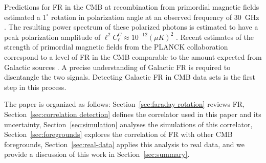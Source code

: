 \documentclass[usenatbib,hidelinks]{mnras}
\begin{document}
{  Predictions for FR in the CMB at recombination from primordial magnetic fields estimated a $1^{\circ}$ rotation in polarization angle at an observed frequency of 30~GHz \citep{Kosowsky:1996yc}. The resulting power spectrum of these polarized photons is estimated to have a peak polarization amplitude of 
$\ell^{2}C_{\ell}^{C} \approx 10^{-12} (\mu K)^{2}$ \citep{kosowsky:2005}. 
 Recent estimates of the strength of primordial magnetic fields from the PLANCK collaboration correspond to a level of FR in the CMB comparable to the amount expected from Galactic sources \citep{planck:2015pmf}. A precise understanding of Galactic FR is required to disentangle the two signals. Detecting Galactic FR in CMB data sets is the first step in this process.	
	

 The paper is organized as follows: Section~\ref{sec:faraday rotation} reviews FR, 
  Section~\ref{sec:correlation detection} defines the correlator used in this paper and its uncertainty, 
  Section~\ref{sec:simulation} analyses the simulations of this correlator,  
  Section~\ref{sec:foregrounds} explores the correlation of FR with other CMB foregrounds, 
 Section~\ref{sec:real-data} applies this analysis to real data, 
and we provide a discussion of this work in  Section~\ref{sec:summary}.
}
  
\end{document}
